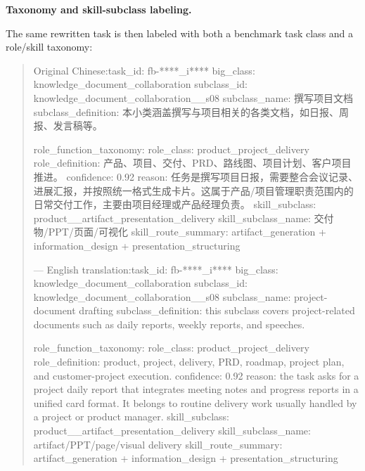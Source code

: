 \documentclass[11pt, a4paper, copyright, frontis]{frontis}
\newcommand{\caseheader}[1]{\noindent\colorbox{fbcaseblue}{\parbox{0.96\linewidth}{\color{white}\bfseries #1}}\vspace{0.5mm}\newline}
\newenvironment{casebox}{%
  \begin{quote}%
  \setlength{\parindent}{0pt}%
  \setlength{\parskip}{0pt}%
}{%
  \end{quote}%
}
\newenvironment{caselines}{%
  \begingroup
  \parindent0pt
  \parskip0pt
  \obeylines
  \obeyspaces
}{%
  \endgroup
}
\begin{document}
\caseheader{Taxonomy and skill-subclass labeling.}
The same rewritten task is then labeled with both a benchmark task class and a role/skill taxonomy:

\begin{casebox}\scriptsize\raggedright
\begin{caselines}
Original Chinese:\nopagebreak[4]
task\_id: fb-****\_i****
big\_class: knowledge\_document\_collaboration
subclass\_id: knowledge\_document\_collaboration\_\_s08
subclass\_name: 撰写项目文档
subclass\_definition: 本小类涵盖撰写与项目相关的各类文档，如日报、周报、发言稿等。

role\_function\_taxonomy:
  role\_class: product\_project\_delivery
  role\_definition: 产品、项目、交付、PRD、路线图、项目计划、客户项目推进。
  confidence: 0.92
  reason: 任务是撰写项目日报，需要整合会议记录、进展汇报，并按照统一格式生成卡片。这属于产品/项目管理职责范围内的日常交付工作，主要由项目经理或产品经理负责。
  skill\_subclass: product\_\_artifact\_presentation\_delivery
  skill\_subclass\_name: 交付物/PPT/页面/可视化
  skill\_route\_summary: artifact\_generation + information\_design + presentation\_structuring

---
English translation:\nopagebreak[4]
task\_id: fb-****\_i****
big\_class: knowledge\_document\_collaboration
subclass\_id: knowledge\_document\_collaboration\_\_s08
subclass\_name: project-document drafting
subclass\_definition: this subclass covers project-related documents such as daily reports, weekly reports, and speeches.

role\_function\_taxonomy:
  role\_class: product\_project\_delivery
  role\_definition: product, project, delivery, PRD, roadmap, project plan, and customer-project execution.
  confidence: 0.92
  reason: the task asks for a project daily report that integrates meeting notes and progress reports in a unified card format. It belongs to routine delivery work usually handled by a project or product manager.
  skill\_subclass: product\_\_artifact\_presentation\_delivery
  skill\_subclass\_name: artifact/PPT/page/visual delivery
  skill\_route\_summary: artifact\_generation + information\_design + presentation\_structuring
\end{caselines}
\end{casebox}
\end{document}
